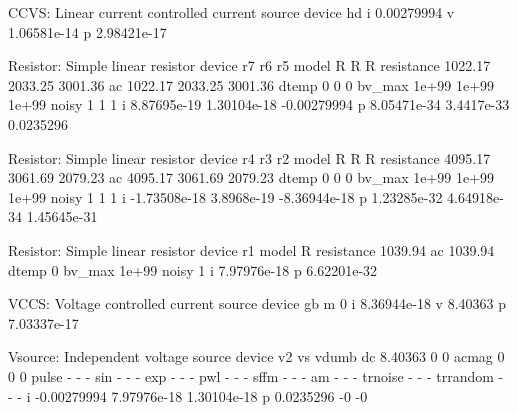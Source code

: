  CCVS: Linear current controlled current source
     device                    hd
          i            0.00279994
          v           1.06581e-14
          p           2.98421e-17

 Resistor: Simple linear resistor
     device                    r7                    r6                    r5
      model                     R                     R                     R
 resistance               1022.17               2033.25               3001.36
         ac               1022.17               2033.25               3001.36
      dtemp                     0                     0                     0
     bv_max                 1e+99                 1e+99                 1e+99
      noisy                     1                     1                     1
          i           8.87695e-19           1.30104e-18           -0.00279994
          p           8.05471e-34            3.4417e-33             0.0235296

 Resistor: Simple linear resistor
     device                    r4                    r3                    r2
      model                     R                     R                     R
 resistance               4095.17               3061.69               2079.23
         ac               4095.17               3061.69               2079.23
      dtemp                     0                     0                     0
     bv_max                 1e+99                 1e+99                 1e+99
      noisy                     1                     1                     1
          i          -1.73508e-18            3.8968e-19          -8.36944e-18
          p           1.23285e-32           4.64918e-34           1.45645e-31

 Resistor: Simple linear resistor
     device                    r1
      model                     R
 resistance               1039.94
         ac               1039.94
      dtemp                     0
     bv_max                 1e+99
      noisy                     1
          i           7.97976e-18
          p           6.62201e-32

 VCCS: Voltage controlled current source
     device                    gb
          m                     0
          i           8.36944e-18
          v               8.40363
          p           7.03337e-17

 Vsource: Independent voltage source
     device                    v2                    vs                 vdumb
         dc               8.40363                     0                     0
      acmag                     0                     0                     0
      pulse         -         -         -
        sin         -         -         -
        exp         -         -         -
        pwl         -         -         -
       sffm         -         -         -
         am         -         -         -
    trnoise         -         -         -
   trrandom         -         -         -
          i           -0.00279994           7.97976e-18           1.30104e-18
          p             0.0235296                    -0                    -0


